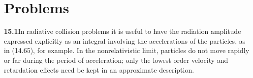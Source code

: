 
\section*{Problems}

\par\bigskip
\noindent\textbf{15.1}\quad In radiative collision problems it is useful to have the radiation amplitude expressed explicitly as an integral involving the accelerations of the particles, as in (14.65), for example. In the nonrelativistic limit, particles do not move rapidly or far during the period of acceleration; only the lowest order velocity and retardation effects need be kept in an approximate description.
